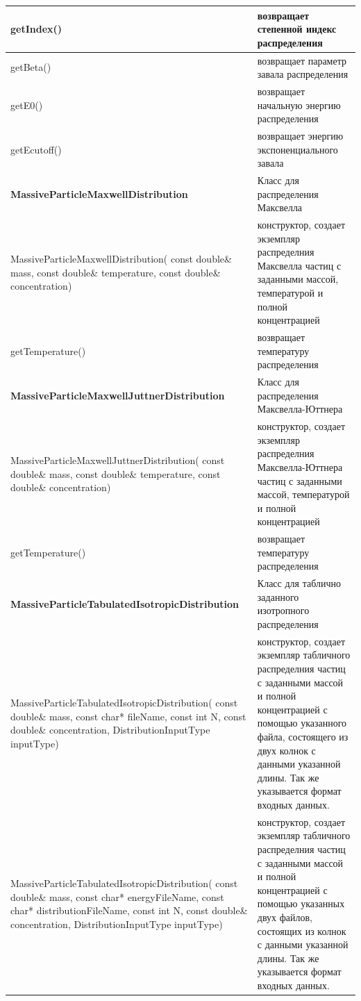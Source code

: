 \begin{small}
\begin{xtabular}{|p{0.52\textwidth}|p{0.48\textwidth}|}
		\hline
		getIndex() & возвращает степенной индекс распределения \\
		\hline
		getBeta() & возвращает параметр завала распределения \\
		\hline
		getE0() & возвращает начальную энергию распределения\\
		\hline
		getEcutoff() & возвращает энергию экспоненциального завала\\
		\hline
		\textbf{MassiveParticleMaxwellDistribution} & Класс для распределения Максвелла\\
		\hline
		MassiveParticleMaxwellDistribution( const double\& mass, const double\& temperature, const double\& concentration) & конструктор, создает экземпляр распределния Максвелла частиц с заданными массой, температурой и полной концентрацией\\
		\hline
		getTemperature() & возвращает температуру распределения\\
		\hline
		\textbf{MassiveParticleMaxwellJuttnerDistribution} & Класс для распределения Максвелла-Юттнера\\
		\hline
		MassiveParticleMaxwellJuttnerDistribution( const double\& mass, const double\& temperature, const double\& concentration) & конструктор, создает экземпляр распределния Максвелла-Юттнера частиц с заданными массой, температурой и полной концентрацией\\
		\hline
		getTemperature() & возвращает температуру распределения\\
		\hline
		\textbf{MassiveParticleTabulatedIsotropicDistribution} & Класс для таблично заданного изотропного распределения\\
		\hline
		MassiveParticleTabulatedIsotropicDistribution( const double\& mass, const char* fileName, const int N, const double\& concentration, DistributionInputType inputType) & конструктор, создает экземпляр табличного распределния частиц с заданными массой и полной концентрацией с помощью указанного файла, состоящего из двух колнок с данными указанной длины. Так же указывается формат входных данных.\\
		\hline
		MassiveParticleTabulatedIsotropicDistribution( const double\& mass, const char* energyFileName, const char* distributionFileName, const int N, const double\& concentration, DistributionInputType inputType) & конструктор, создает экземпляр табличного распределния частиц с заданными массой и полной концентрацией с помощью указанных двух файлов, состоящих из колнок с данными указанной длины. Так же указывается формат входных данных. \\

\end{xtabular}
\end{small}
